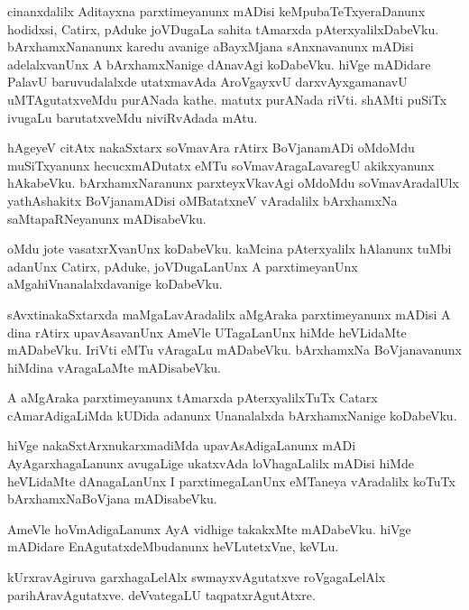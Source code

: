 \begin{mng}
cinanxdalilx Aditayxna parxtimeyanunx mADisi keMpubaTeTxyeraDanunx hodidxsi, Catirx, pAduke joVDugaLa sahita tAmarxda pAterxyalilxDabeVku. bArxhamxNananunx karedu avanige aBayxMjana sAnxnavanunx mADisi adelalxvanUnx A bArxhamxNanige dAnavAgi koDabeVku. hiVge mADidare PalavU baruvudalalxde utatxmavAda AroVgayxvU darxvAyxgamanavU uMTAgutatxveMdu purANada kathe. matutx purANada riVti. shAMti puSiTx ivugaLu barutatxveMdu niviRvAdada mAtu.
\end{mng}

\begin{mng}
hAgeyeV citAtx nakaSxtarx soVmavAra rAtirx BoVjanamADi oMdoMdu muSiTxyanunx hecucxmADutatx eMTu soVmavAragaLavaregU akikxyanunx hAkabeVku. bArxhamxNaranunx parxteyxVkavAgi oMdoMdu soVmavAradalUlx yathAshakitx BoVjanamADisi oMBatatxneV vAradalilx bArxhamxNa saMtapaRNeyanunx mADisabeVku.
\end{mng}

\begin{mng}
oMdu jote vasatxrXvanUnx koDabeVku. kaMcina pAterxyalilx hAlanunx tuMbi adanUnx Catirx, pAduke, joVDugaLanUnx A parxtimeyanUnx aMgahiVnanalalxdavanige koDabeVku.
\end{mng}

\begin{mng}
sAvxtinakaSxtarxda maMgaLavAradalilx aMgAraka parxtimeyanunx mADisi A dina rAtirx upavAsavanUnx AmeVle UTagaLanUnx hiMde heVLidaMte mADabeVku. IriVti eMTu vAragaLu mADabeVku. bArxhamxNa BoVjanavanunx hiMdina vAragaLaMte mADisabeVku.
\end{mng}

\begin{mng}
A aMgAraka parxtimeyanunx tAmarxda pAterxyalilxTuTx Catarx cAmarAdigaLiMda kUDida adanunx Unanalalxda bArxhamxNanige koDabeVku.
\end{mng}

\begin{mng}
hiVge nakaSxtArxnukarxmadiMda upavAsAdigaLanunx mADi AyAgarxhagaLanunx avugaLige ukatxvAda loVhagaLalilx mADisi hiMde heVLidaMte dAnagaLanUnx I parxtimegaLanUnx eMTaneya vAradalilx koTuTx bArxhamxNaBoVjana mADisabeVku.
\end{mng}

\begin{mng}
AmeVle hoVmAdigaLanunx AyA vidhige takakxMte mADabeVku. hiVge mADidare EnAgutatxdeMbudanunx heVLutetxVne, keVLu.
\end{mng}

\begin{mng}
kUrxravAgiruva garxhagaLelAlx swmayxvAgutatxve roVgagaLelAlx parihAravAgutatxve. deVvategaLU taqpatxrAgutAtxre.
\end{mng}


